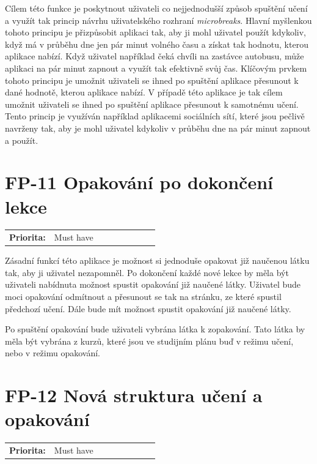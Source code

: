 Cílem této funkce je poskytnout uživateli co nejjednodušší způsob spuštění učení a využít tak princip návrhu uživatelského rozhraní \textit{microbreaks}. Hlavní myšlenkou tohoto principu je přizpůsobit aplikaci tak, aby ji mohl uživatel použít kdykoliv, když má v průběhu dne jen pár minut volného času a získat tak hodnotu, kterou aplikace nabízí. Když uživatel například čeká chvíli na zastávce autobusu, může aplikaci na pár minut zapnout a využít tak efektivně svůj čas. Klíčovým prvkem tohoto principu je umožnit uživateli se ihned po spuštění aplikace přesunout k dané hodnotě, kterou aplikace nabízí. V případě této aplikace je tak cílem umožnit uživateli se ihned po spuštění aplikace přesunout k samotnému učení. Tento princip je využíván například aplikacemi sociálních sítí, které jsou pečlivě navrženy tak, aby je mohl uživatel kdykoliv v průběhu dne na pár minut zapnout a použít. \cite{Tidwell2020DesigningInterfaces}

\section{FP-11 Opakování po dokončení lekce}\label{sec:fp-post-lesson-review}

\begin{tabular}{lp{0.7\linewidth}}
    \textbf{Priorita:} & Must have \\
\end{tabular}

Zásadní funkcí této aplikace je možnost si jednoduše opakovat již naučenou látku tak, aby ji uživatel nezapomněl. Po dokončení každé nové lekce by měla být uživateli nabídnuta možnost spustit opakování již naučené látky. Uživatel bude moci opakování odmítnout a přesunout se tak na stránku, ze které spustil předchozí učení. Dále bude mít možnost spustit opakování již naučené látky.

Po spuštění opakování bude uživateli vybrána látka k zopakování. Tato látka by měla být vybrána z kurzů, které jsou ve studijním plánu buď v režimu učení, nebo v režimu opakování.

\section{FP-12 Nová struktura učení a opakování}\label{sec:fp-learning-structure}

\begin{tabular}{lp{0.7\linewidth}}
    \textbf{Priorita:} & Must have \\
\end{tabular}

